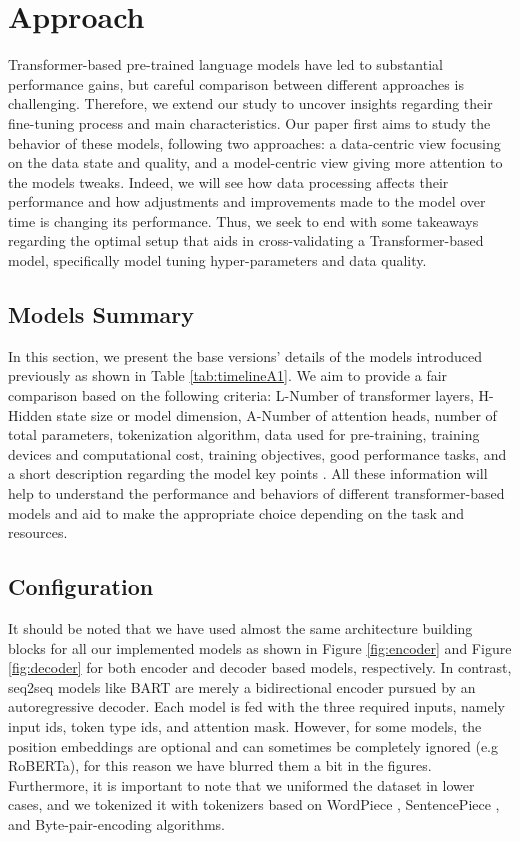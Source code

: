 \documentclass{article}
\begin{document}
\section{Approach}
Transformer-based pre-trained language models have led to substantial performance gains, but careful comparison between different approaches is challenging. Therefore, we extend our study to uncover insights regarding their fine-tuning process and main characteristics. Our paper first aims to study the behavior of these models, following two approaches: a data-centric view focusing on the data state and quality, and a model-centric view giving more attention to the models tweaks. Indeed, we will see how data processing affects their performance and how adjustments and improvements made to the model over time is changing its performance. Thus, we seek to end with some takeaways regarding the optimal setup that aids in cross-validating a Transformer-based model, specifically model tuning hyper-parameters and data quality.

\subsection{Models Summary}
In this section, we present the base versions' details of the models introduced previously as shown in Table \ref{tab:timelineA1}.  We aim to provide a fair comparison based on the following criteria: L-Number of transformer layers, H-Hidden state size or model dimension, A-Number of attention heads, number of total parameters, tokenization algorithm, data used for pre-training, training devices and computational cost, training objectives, good performance tasks, and a short description regarding the model key points \cite{singh2021nlp}. All these information will help to understand the performance and behaviors of different transformer-based models and aid to make the appropriate choice depending on the task and resources.


\subsection{Configuration}
It should be noted that we have used almost the same architecture building blocks for all our implemented models as shown in Figure \ref{fig:encoder} and Figure \ref{fig:decoder} for both encoder and decoder based models, respectively. In contrast, seq2seq models like BART are merely a bidirectional encoder pursued by an autoregressive decoder. Each model is fed with the three required inputs, namely input ids, token type ids, and attention mask. However, for some models, the position embeddings are optional and can sometimes be completely ignored (e.g RoBERTa), for this reason we have blurred them a bit in the figures. Furthermore, it is important to note that we uniformed the dataset in lower cases, and we tokenized it with tokenizers based on WordPiece \cite{wu2016google}, SentencePiece \cite{kudo2018sentencepiece}, and Byte-pair-encoding \cite{sennrich2015neural} algorithms.
\end{document}
